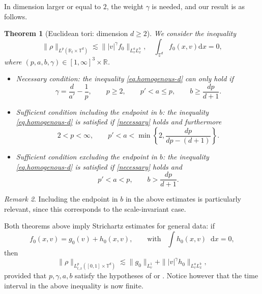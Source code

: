 \documentclass[11pt,a4paper,reqno]{amsart}
\theoremstyle{plain}
\newtheorem{theorem}{Theorem}[section]
\theoremstyle{remark}
\newtheorem{remark}[theorem]{Remark}
\newcommand{\dd}{\mathop{}\!\mathrm{d}}
\begin{document}
In dimension larger or equal to $2$, the weight $\gamma$ is needed, and our result is as follows.

\begin{theorem}[Euclidean tori: dimension $d\geq 2$]\label{thm.noest-dim2}
We consider the inequality
\begin{equation}
    \label{eq.homogenous-d}
    \|\rho\|_{L^p(\mathbb{R}_t \times \mathbb{T}^d)} \lesssim \| |v|^{\gamma} f_0\|_{L^a_vL^b_x}, \quad \int_{\mathbb{T}^d}f_0(x,v)\mathrm{d}x = 0, 
\end{equation}
where $(p,a,b,\gamma) \in [1,\infty]^3 \times \mathbb{R}$. 
\begin{itemize}
\item[(i)] Necessary condition: the inequality \eqref{eq.homogenous-d} can only hold if
\begin{equation}
\label{necessary}
    \gamma = \frac{d}{a'}-\frac{1}{p}, \qquad p\geq 2, \qquad  p'<a\leq p, \qquad b\geq \frac{dp}{d+1}.
\end{equation}
\item[(ii)] Sufficient condition including the endpoint in $b$: the inequality \eqref{eq.homogenous-d} is satisfied if \eqref{necessary} holds and furthermore
\[ 
    2<p<\infty, \qquad p'<a < \min\left\{2,\frac{dp}{dp-(d+1)}\right\}.
\]
\item[(iii)] Sufficient condition excluding the endpoint in $b$: the inequality \eqref{eq.homogenous-d} is satisfied if \eqref{necessary} holds and
\[
    p'<a < p, \qquad b > \frac{dp}{d+1}.
\]
\end{itemize}
\end{theorem}


\begin{remark}
Including the endpoint in $b$ in the above estimates is particularly relevant, since this corresponds to the scale-invariant case.
\end{remark}

Both theorems above imply Strichartz estimates for general data: if
\[
    f_0(x,v) = g_0(v) + h_0(x,v), \qquad \mbox{with} \;\;\; \int h_0(x,v) \dd x = 0,
\]
then
\begin{equation*}
    \|\rho \|_{L^p_{t,x}([0,1]\times \mathbb{T}^d)} \lesssim \|g_0\|_{L^1_v} + \||v|^\gamma h_0 \|_{L^{a}_v L^{b}_x},
\end{equation*}
provided that $p,\gamma,a,b$ satisfy the hypotheses of  or . Notice however that the time interval in the above inequality is now finite.
\end{document}
